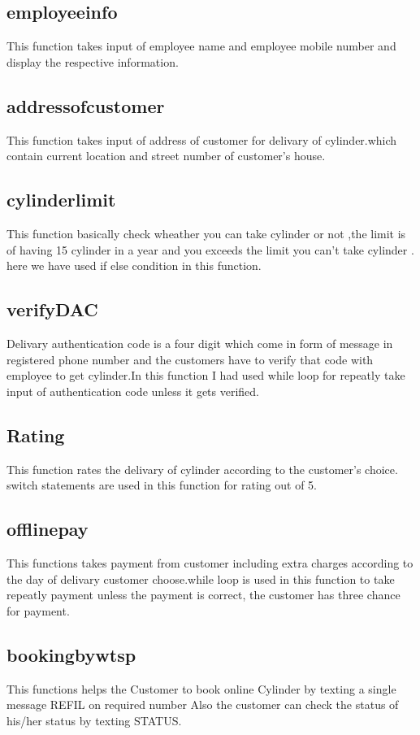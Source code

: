 \documentclass{article}
\begin{document}
\subsection{employeeinfo}
This function takes input of employee name and employee mobile number and display the respective information.
\subsection{addressofcustomer}
This function takes input of address of customer for delivary of cylinder.which contain current location and street number of customer's house.
\subsection{cylinderlimit}
This function basically check wheather you can take cylinder or not ,the limit is of having 15 cylinder in  a year and you exceeds the limit you can't take cylinder . here we have used if else condition in this function.
\subsection{verifyDAC}
Delivary authentication code is a four digit which come in form of message in registered phone number and the customers have to verify that code with employee to get cylinder.In this function I had used while loop for repeatly take input of authentication code unless it  gets verified.
\subsection{Rating}
This function rates the delivary of cylinder according to the customer's choice. switch statements are used in this function for rating out of 5.
\subsection{offlinepay}
This functions takes payment from customer including extra charges according to the day of delivary customer choose.while loop is used in this function to take repeatly payment unless the payment is correct, the customer has three chance for payment.
\subsection{bookingbywtsp}
This functions helps the Customer to book online Cylinder by texting a single message REFIL on required number Also the customer can check the status of his/her status by texting STATUS.
\end{document}
